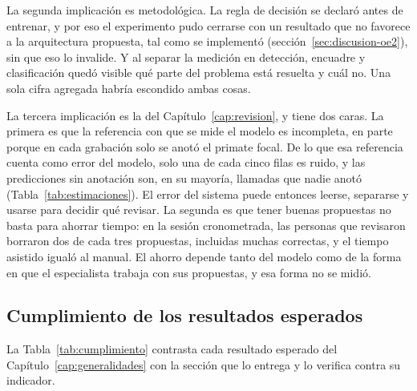 La segunda implicación es metodológica. La regla de decisión se declaró antes de
entrenar, y por eso el experimento pudo cerrarse con un resultado que no favorece
a la arquitectura propuesta, tal como se implementó
(sección~\ref{sec:discusion-oe2}), sin que eso lo invalide. Y al separar la
medición en detección, encuadre y clasificación quedó visible qué parte del
problema está resuelta y cuál no. Una sola cifra agregada habría escondido ambas
cosas.

La tercera implicación es la del Capítulo~\ref{cap:revision}, y tiene dos caras.
La primera es que la referencia con que se mide el modelo es incompleta, en
parte porque en cada grabación solo se anotó el primate focal. De lo que esa
referencia cuenta como error del modelo, solo una de cada cinco filas es
ruido, y las predicciones sin anotación son, en su mayoría, llamadas que nadie
anotó (Tabla~\ref{tab:estimaciones}). El error del sistema puede entonces leerse, separarse y usarse para
decidir qué revisar. La segunda es que tener buenas propuestas no basta para
ahorrar tiempo: en la sesión cronometrada, las personas que revisaron borraron
dos de cada tres propuestas, incluidas muchas correctas, y el tiempo asistido
igualó al manual. El ahorro depende tanto del modelo como de la forma en que el
especialista trabaja con sus propuestas, y esa forma no se midió.

\subsection{Cumplimiento de los resultados esperados}

La Tabla~\ref{tab:cumplimiento} contrasta cada resultado esperado del
Capítulo~\ref{cap:generalidades} con la sección que lo entrega y lo verifica
contra su indicador.

